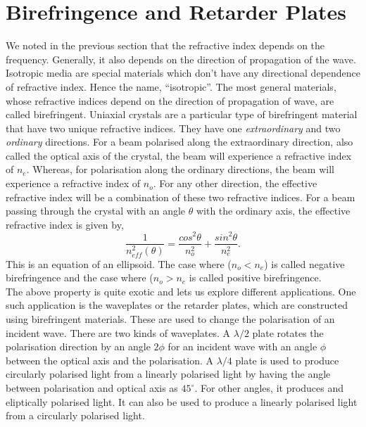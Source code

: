 \section{Birefringence and Retarder Plates}
We noted in the previous section that the refractive index depends on the frequency. Generally, it also depends on the direction of propagation of the wave. Isotropic media are special materials which don't have any directional dependence of refractive index. Hence the name, ``isotropic''. The most general materials, whose refractive indices depend on the direction of propagation of wave, are called birefringent. Uniaxial crystals are a particular type of birefringent material that have two unique refractive indices. They have one \textit{extraordinary} and two \textit{ordinary} directions. For a beam polarised along the extraordinary direction, also called the optical axis of the crystal, the beam will experience a refractive index of $n_e$. Whereas, for polarisation along the ordinary directions, the beam will experience a refractive index of $n_o$. For any other direction, the effective refractive index will be a combination of these two refractive indices. For a beam passing through the crystal with an angle $\theta$ with the ordinary axis, the effective refractive index is given by,
\begin{equation}
    \frac{1}{n_{eff}^2(\theta)} = \frac{cos^2\theta}{n_o^2} + \frac{sin^2\theta}{n_e^2}.
\end{equation}
This is an equation of an ellipsoid. The case where ($n_o < n_e$) is called negative birefringence and the case where ($n_o > n_e$ is called positive birefringence.\\
The above property is quite exotic and lets us explore different applications. One such application is the waveplates or the retarder plates, which are constructed using birefringent materials. These are used to change the polarisation of an incident wave. There are two kinds of waveplates. A $\lambda/2$ plate rotates the polarisation direction by an angle $2\phi$ for an incident wave with an angle $\phi$ between the optical axis and the polarisation. A $\lambda/4$ plate is used to produce circularly polarised light from a linearly polarised light by having the angle between polarisation and optical axis as $45^{\circ}$. For other angles, it produces and eliptically polarised light. It can also be used to produce a linearly polarised light from a circularly polarised light.